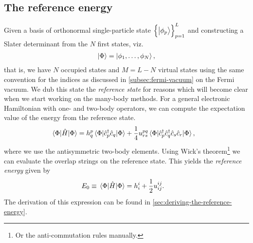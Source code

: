         \subsection{The reference energy}
            Given a basis of orthonormal single-particle state
            $\left\{ \ket{\phi_p} \right\}_{p = 1}^{L}$ and constructing a Slater
            determinant from the $N$ first states, viz.
            \begin{align}
                \ket{\Phi} = \ket{\phi_1, \dots, \phi_N},
            \end{align}
            that is, we have $N$ occupied states and $M = L - N$ virtual states
            using the same convention for the indices as discussed in
            \autoref{subsec:fermi-vacuum} on the Fermi vacuum.
            We dub this state the \emph{reference state} for reasons which will
            become clear when we start working on the many-body methods.
            For a general electronic Hamiltonian with one- and two-body
            operators, we can compute the expectation value of the energy from
            the reference state.
            \begin{align}
                \mel{\Phi}{\hat{H}}{\Phi}
                &=
                h^{p}_{q}
                \mel{\Phi}{\hat{c}_{p}^{\dagger}\hat{c}_{q}}{\Phi}
                + \frac{1}{4}
                u^{pq}_{rs}
                \mel{\Phi}{\hat{c}_{p}^{\dagger}\hat{c}_{q}^{\dagger}\hat{c}_{s}\hat{c}_{r}}{\Phi},
            \end{align}
            where we use the antisymmetric two-body elements.
            Using Wick's theorem\footnote{%
                Or the anti-commutation rules manually.
            } we can evaluate the overlap strings on the reference state.
            This yields the \emph{reference energy} given by
            \begin{align}
                E_{0}
                &\equiv
                \mel{\Phi}{\hat{H}}{\Phi}
                =
                h^{i}_{i}
                + \frac{1}{2}u^{ij}_{ij}.
                \label{eq:reference-energy}
            \end{align}
            The derivation of this expression can be found in
            \autoref{sec:deriving-the-reference-energy}.

